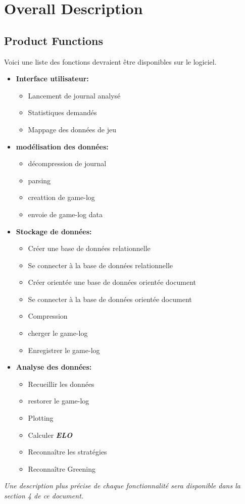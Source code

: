 \documentclass{scrreprt}
\begin{document}
\chapter{Overall Description}


\section{Product Functions}

Voici une liste des fonctions devraient être disponibles sur le logiciel.
\begin{itemize}
\item{\textbf{Interface utilisateur:}}

    \begin{itemize}
    \item{Lancement de  journal analysé}
    \item{Statistiques demandés}
    \item{Mappage des données de jeu}
    \end{itemize}
  \item{\textbf{modélisation des données:}}
    \begin{itemize}
    \item{décompression de journal}
    \item{parsing}
    \item{creattion de game-log}
    \item{envoie de game-log data}
    \end{itemize}
  \item{\textbf{Stockage de données:}}
    \begin{itemize}
    \item{Créer une base de données relationnelle}
    \item{Se connecter à la base de données relationnelle}
    \item{Créer orientée une base de données orientée document}
    \item{Se connecter à la base de données orientée document}
    \item{Compression}
    \item{cherger le game-log}
    \item{Enregistrer le game-log}
    \end{itemize}
  \item{\textbf{Analyse des données:}}
    \begin{itemize}
      \item{Recueillir les données}
      \item{restorer le game-log}
      \item{Plotting}
      \item{Calculer \textit{\textbf{ELO}}}
      \item{Reconnaître les stratégies}
      \item{Reconnaître Greening}
    \end{itemize}
\end{itemize}
\textit{ Une description plus précise de chaque fonctionnalité sera disponible dans la section 4 de ce document. }
\end{document}
